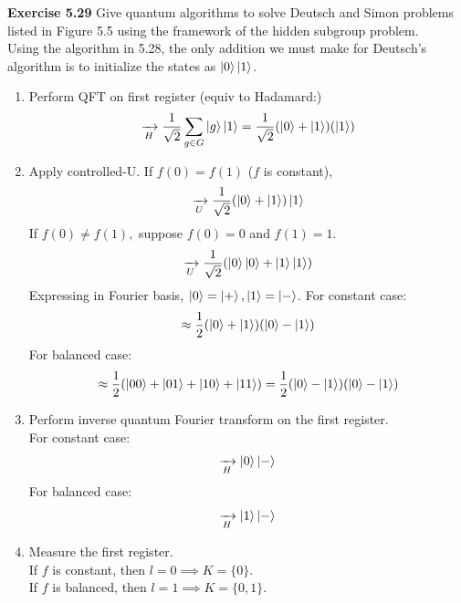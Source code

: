 \documentclass{article}
\begin{document}
\begin{tcolorbox}\textbf{Exercise 5.29} Give quantum algorithms to solve Deutsch and Simon problems listed in Figure 5.5 using the framework of the hidden subgroup problem.\\
	Using the algorithm in 5.28, the only addition we must make for Deutsch's algorithm is to initialize the states as $\ket{0}\ket{1}$.
	\begin{enumerate}
		\item Perform QFT on first register (equiv to Hadamard:)
			$$ \xrightarrow[H]{} \frac{1}{\sqrt{2}} \sum_{g\in G}\ket{g}\ket{1} = \frac{1}{\sqrt{2}}(\ket0 + \ket1)(\ket{1})$$
		\item Apply controlled-U. If $f(0) = f(1)$ ($f$ is constant),
			$$\xrightarrow[U]{} \frac{1}{\sqrt{2}}(\ket0 + \ket1)\ket1 $$
		If $f(0) \neq f(1),$ suppose $f(0) = 0$ and $f(1) = 1$.
		$$ \xrightarrow[U]{} \frac{1}{\sqrt{2}}(\ket0 \ket0 + \ket1 \ket 1)$$
		Expressing in Fourier basis, $\ket{0} = \ket{+},\ket{1} = \ket{-}$.
		For constant case:
		$$ \approx \frac12 (\ket{0}+\ket1)(\ket0 - \ket1)$$
		For balanced case:
		$$\approx \frac12(\ket{00} + \ket{01} + \ket{10} + \ket{11}) = \frac12(\ket{0}-\ket{1})(\ket{0}-\ket{1})$$
		\item Perform inverse quantum Fourier transform on the first register.\\ 
			For constant case:
			$$\xrightarrow[H]{}  \ket{0}\ket{-}$$
			For balanced case:
			$$\xrightarrow[H]{} \ket{1}\ket{-}$$
		\item Measure the first register.\\
			If $f$ is constant, then $l = 0 \implies K = \{0\}$. \\If $f$ is balanced, then $l=1 \implies K = \{0,1\}$.
	\end{enumerate}
\end{tcolorbox}
\end{document}
